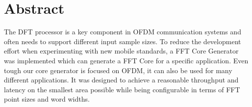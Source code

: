 \chapter*{Abstract}
The \gls{DFT} processor is a key component in
\gls{OFDM} communication systems
and often needs to support different input sample sizes.
To reduce the development effort when experimenting with new mobile standards,
a \gls{FFT} Core Generator was implemented which can generate a \gls{FFT} Core for
a specific application.
Even tough our core generator is focused on \gls{OFDM},
it can also be used for many different applications.
It was designed to achieve a reasonable throughput and latency
on the smallest area possible while being configurable in terms of
\gls{FFT} point sizes and word widths.

